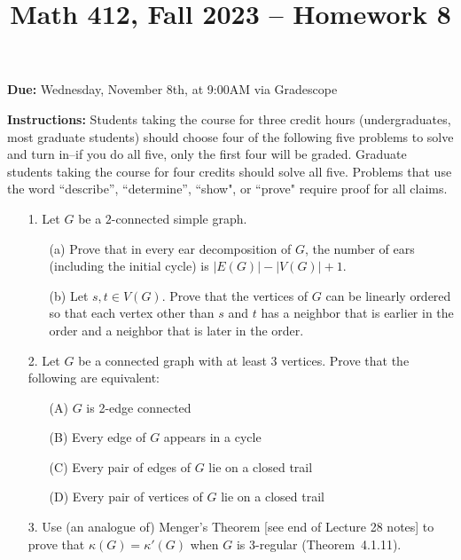 \documentclass[12pt]{article}
\title{Math 412, Fall 2023 -- Homework 8}
\date{}
\begin{document}
 \maketitle
\vspace{-80pt}

\textbf{Due:} Wednesday, November 8th, at 9:00AM via Gradescope

\textbf{Instructions:} Students taking the course for three credit hours (undergraduates, most graduate
students) should choose four of the following five problems to solve and turn in--if you do all five, only the first four will be graded. Graduate students
taking the course for four credits should solve all five. Problems that use the word ``describe”,
``determine”, ``show", or ``prove" require proof for all claims.

\begin{enumerate}

\item[1.] Let $G$ be a $2$-connected simple graph.

\begin{enumerate}
\item[(a)] Prove that in every ear decomposition of $G$, the number of ears (including the initial cycle) is $|E(G)|-|V(G)|+1$.
    
\item[(b)] Let $s,t\in V(G)$. Prove that the vertices of $G$ can be linearly ordered so that each vertex other than $s$ and $t$ has a neighbor that is earlier in the order and a neighbor that is later in the order.
 
\end{enumerate}

\item[2.] Let $G$ be a connected graph with at least 3 vertices. Prove that the following are equivalent:

\begin{enumerate}
    \item[(A)] $G$ is 2-edge connected
    \item[(B)] Every edge of $G$ appears in a cycle
    \item[(C)] Every pair of edges of $G$ lie on a closed trail
    \item[(D)] Every pair of vertices of $G$ lie on a closed trail
\end{enumerate}

\item[3.] Use (an analogue of) Menger's Theorem [see end of Lecture 28 notes] to prove that $\kappa(G)=\kappa'(G)$ when $G$ is 3-regular (Theorem~4.1.11).


\end{enumerate}
\end{document}
